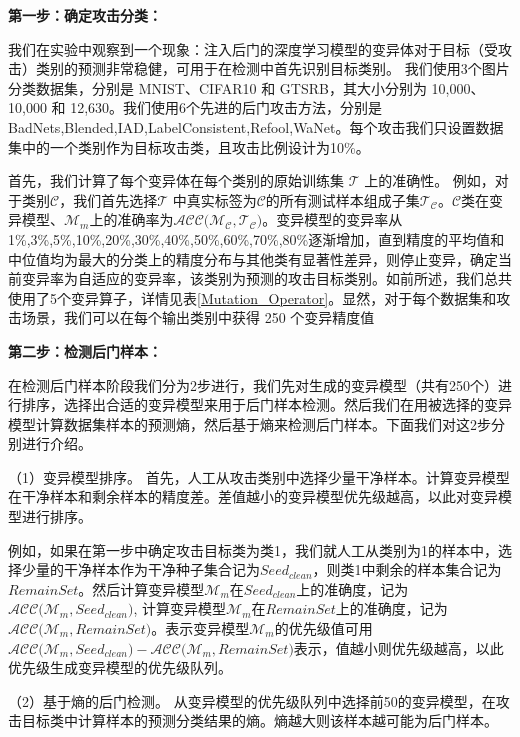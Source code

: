 \documentclass[fontset=macnew,UTF8]{article} %
\begin{document}
\textbf{第一步：确定攻击分类：}

我们在实验中观察到一个现象：注入后门的深度学习模型的变异体对于目标（受攻击）类别的预测非常稳健，可用于在检测中首先识别目标类别。 我们使用3个图片分类数据集，分别是 MNIST、CIFAR10 和 GTSRB，其大小分别为 10,000、10,000 和 12,630。我们使用6个先进的后门攻击方法，分别是BadNets\cite{gu2019badnets},Blended\cite{chen2017targeted},IAD\cite{nguyen2020input},LabelConsistent\cite{turner2019label},Refool\cite{liu2020reflection},WaNet\cite{nguyen2021wanet}。每个攻击我们只设置数据集中的一个类别作为目标攻击类，且攻击比例设计为10\%。

首先，我们计算了每个变异体在每个类别的原始训练集 $\mathcal{T}$ 上的准确性。 例如，对于类别$\mathcal{C}$，我们首先选择$\mathcal{T}$ 中真实标签为$\mathcal{C}$的所有测试样本组成子集$\mathcal{T_C}$。$\mathcal{C}$类在变异模型、$\mathcal{M}_m$上的准确率为$\mathcal{ACC(M_C},\mathcal{T_C})$。变异模型的变异率从1\%,3\%,5\%,10\%,20\%,30\%,40\%,50\%,60\%,70\%,80\%逐渐增加，直到精度的平均值和中位值均为最大的分类上的精度分布与其他类有显著性差异，则停止变异，确定当前变异率为自适应的变异率，该类别为预测的攻击目标类别。如前所述，我们总共使用了5个变异算子，详情见表\ref{Mutation_Operator}。显然，对于每个数据集和攻击场景，我们可以在每个输出类别中获得 250 个变异精度值

\textbf{第二步：检测后门样本：}

在检测后门样本阶段我们分为2步进行，我们先对生成的变异模型（共有250个）进行排序，选择出合适的变异模型来用于后门样本检测。然后我们在用被选择的变异模型计算数据集样本的预测熵，然后基于熵来检测后门样本。下面我们对这2步分别进行介绍。

（1）变异模型排序。
首先，人工从攻击类别中选择少量干净样本。计算变异模型在干净样本和剩余样本的精度差。差值越小的变异模型优先级越高，以此对变异模型进行排序。

例如，如果在第一步中确定攻击目标类为类1，我们就人工从类别为1的样本中，选择少量的干净样本作为干净种子集合记为$Seed_{clean}$，则类1中剩余的样本集合记为$RemainSet$。然后计算变异模型$\mathcal{M}_m$在$Seed_{clean}$上的准确度，记为$\mathcal{ACC(}\mathcal{M}_m, Seed_{clean}\mathcal{)}$,  计算变异模型$\mathcal{M}_m$在$RemainSet$上的准确度，记为$\mathcal{ACC(}\mathcal{M}_m, RemainSet\mathcal{)}$。表示变异模型$\mathcal{M}_m$的优先级值可用$\mathcal{ACC(}\mathcal{M}_m,Seed_{clean}\mathcal{)}-\mathcal{ACC(}\mathcal{M}_m,RemainSet\mathcal{)}$表示，值越小则优先级越高，以此优先级生成变异模型的优先级队列。

（2）基于熵的后门检测。
从变异模型的优先级队列中选择前50的变异模型，在攻击目标类中计算样本的预测分类结果的熵。熵越大则该样本越可能为后门样本。
\end{document}
